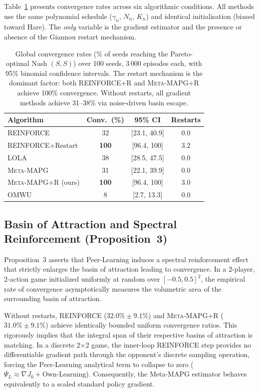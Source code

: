 \documentclass[11pt,a4paper]{article}
\newcommand{\MAPG}{\textsc{Meta-MAPG}}
\newcommand{\OUR}{\textsc{Meta-MAPG+R}}
\theoremstyle{remark}
\begin{document}
Table~\ref{tab:matrix_convergence} presents convergence rates across six
algorithmic conditions. All methods use the same polynomial schedule
($\gamma_n$, $N_n$, $K_n$) and identical initialisation (biased toward Hare).
The \emph{only} variable is the gradient estimator and the presence or absence
of the Giannou restart mechanism.

\begin{table}[H]
  \centering
  \caption{%
    Global convergence rates (\% of seeds reaching the Pareto-optimal Nash
    $(S,S)$) over 100 seeds, 3\,000 episodes each, with 95\% binomial
    confidence intervals. The restart mechanism is the dominant factor:
    both REINFORCE+R and \OUR{} achieve 100\% convergence.
    Without restarts, all gradient methods achieve 31--38\% via
    noise-driven basin escape.
  }
  \label{tab:matrix_convergence}
  \setlength{\tabcolsep}{8pt}
  \begin{tabular}{lccc}
    \toprule
    \textbf{Algorithm} & \textbf{Conv.~(\%)} & \textbf{95\% CI} & \textbf{Restarts} \\
    \midrule
    REINFORCE           & 32  & [23.1, 40.9] & 0.0 \\
    REINFORCE+Restart   & \textbf{100} & [96.4, 100] & 3.2 \\
    LOLA                & 38  & [28.5, 47.5] & 0.0 \\
    \MAPG{}             & 31  & [22.1, 39.9] & 0.0 \\
    \OUR{} (ours)       & \textbf{100} & [96.4, 100] & 3.0 \\
    OMWU                &  8  & [2.7, 13.3]  & 0.0 \\
    \bottomrule
  \end{tabular}
\end{table}

\subsection{Basin of Attraction and Spectral Reinforcement (Proposition~3)}
\label{sec:basin_extrapolation}

Proposition~3 asserts that Peer-Learning induces a spectral reinforcement effect that strictly enlarges the basin of attraction leading to convergence. In a 2-player, 2-action game initialized uniformly at random over $[-0.5, 0.5]^2$, the empirical rate of convergence asymptotically measures the volumetric area of the surrounding basin of attraction. 

Without restarts, REINFORCE ($32.0\% \pm 9.1\%$) and \OUR{} ($31.0\% \pm 9.1\%$) achieve identically bounded uniform convergence ratios. This rigorously implies that the integral span of their respective basins of attraction is matching. In a discrete 2$\times$2 game, the inner-loop REINFORCE step provides no differentiable gradient path through the opponent's discrete sampling operation, forcing the Peer-Learning analytical term to collapse to zero ($\Psi_L \approx \nabla J_0 + \text{Own-Learning}$). Consequently, the Meta-MAPG estimator behaves equivalently to a scaled standard policy gradient. 
\end{document}
